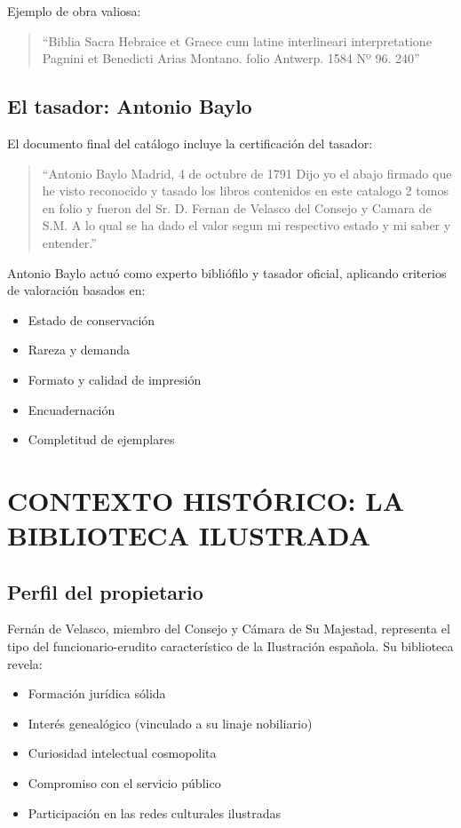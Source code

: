 \documentclass[12pt,a4paper]{article}
\begin{document}
Ejemplo de obra valiosa:

\begin{quote}
``Biblia Sacra Hebraice et Graece cum latine interlineari interpretatione Pagnini et Benedicti Arias Montano. folio Antwerp. 1584 Nº 96. 240''
\end{quote}

\subsection{El tasador: Antonio Baylo}

El documento final del catálogo incluye la certificación del tasador:

\begin{quote}
``Antonio Baylo Madrid, 4 de octubre de 1791 Dijo yo el abajo firmado que he visto reconocido y tasado los libros contenidos en este catalogo 2 tomos en folio y fueron del Sr. D. Fernan de Velasco del Consejo y Camara de S.M. A lo qual se ha dado el valor segun mi respectivo estado y mi saber y entender.''
\end{quote}

Antonio Baylo actuó como experto bibliófilo y tasador oficial, aplicando criterios de valoración basados en:
\begin{itemize}
    \item Estado de conservación
    \item Rareza y demanda
    \item Formato y calidad de impresión
    \item Encuadernación
    \item Completitud de ejemplares
\end{itemize}

\section{CONTEXTO HISTÓRICO: LA BIBLIOTECA ILUSTRADA}

\subsection{Perfil del propietario}

Fernán de Velasco, miembro del Consejo y Cámara de Su Majestad, representa el tipo del funcionario-erudito característico de la Ilustración española. Su biblioteca revela:

\begin{itemize}
    \item Formación jurídica sólida
    \item Interés genealógico (vinculado a su linaje nobiliario)
    \item Curiosidad intelectual cosmopolita
    \item Compromiso con el servicio público
    \item Participación en las redes culturales ilustradas
\end{itemize}
\end{document}
